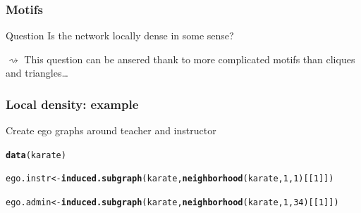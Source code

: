 \documentclass{beamer}\usepackage[]{graphicx}\usepackage[]{color}
\makeatletter
\newcommand{\hlnum}[1]{\textcolor[rgb]{0.686,0.059,0.569}{#1}}%
\newcommand{\hlstd}[1]{\textcolor[rgb]{0.345,0.345,0.345}{#1}}%
\newcommand{\hlkwb}[1]{\textcolor[rgb]{0.69,0.353,0.396}{#1}}%
\newcommand{\hlkwd}[1]{\textcolor[rgb]{0.737,0.353,0.396}{\textbf{#1}}}%
\newenvironment{kframe}{%
 \def\at@end@of@kframe{}%
 \ifinner\ifhmode%
  \def\at@end@of@kframe{\end{minipage}}%
  \begin{minipage}{\columnwidth}%
 \fi\fi%
 \def\FrameCommand##1{\hskip\@totalleftmargin \hskip-\fboxsep
 \colorbox{shadecolor}{##1}\hskip-\fboxsep
     \hskip-\linewidth \hskip-\@totalleftmargin \hskip\columnwidth}%
 \MakeFramed {\advance\hsize-\width
   \@totalleftmargin\z@ \linewidth\hsize
   \@setminipage}}%
 {\par\unskip\endMakeFramed%
 \at@end@of@kframe}
\newenvironment{knitrout}{}{} %
\makeatother
\begin{document}
\begin{frame}
  \frametitle{Motifs}

  \begin{block}{Question}
    Is the network locally \alert{dense} in some sense?
  \end{block}

  $\rightsquigarrow$ This question can be ansered thank to more complicated motifs than cliques and triangles\dots
\end{frame}


\begin{frame}[fragile]
  \frametitle{Local density: example}



Create ego graphs around teacher and instructor
\begin{knitrout}\scriptsize
{}\color{fgcolor}\begin{kframe}
\begin{alltt}
\hlkwd{data}\hlstd{(karate)}

\hlstd{ego.instr} \hlkwb{<-} \hlkwd{induced.subgraph}\hlstd{(karate,} \hlkwd{neighborhood}\hlstd{(karate,} \hlnum{1}\hlstd{,} \hlnum{1}\hlstd{)[[}\hlnum{1}\hlstd{]])}
\end{alltt}


{\ttfamily\noindent\bfseries\color{errorcolor}{\#\# Error in FUN(X[[i]], ...): as.sociomatrix.sna input must be an adjacency matrix/array, network, or list.}}\begin{alltt}
\hlstd{ego.admin} \hlkwb{<-} \hlkwd{induced.subgraph}\hlstd{(karate,} \hlkwd{neighborhood}\hlstd{(karate,} \hlnum{1}\hlstd{,} \hlnum{34}\hlstd{)[[}\hlnum{1}\hlstd{]])}
\end{alltt}


{\ttfamily\noindent\bfseries\color{errorcolor}{\#\# Error in FUN(X[[i]], ...): as.sociomatrix.sna input must be an adjacency matrix/array, network, or list.}}\end{kframe}
\end{knitrout}

\begin{knitrout}\scriptsize
{}\color{fgcolor}\begin{kframe}


{\ttfamily\noindent\bfseries\color{errorcolor}{\#\# Error in plot(ego.instr): object 'ego.instr' not found}}


\end{kframe}
\end{knitrout}
\end{frame}
\end{document}
